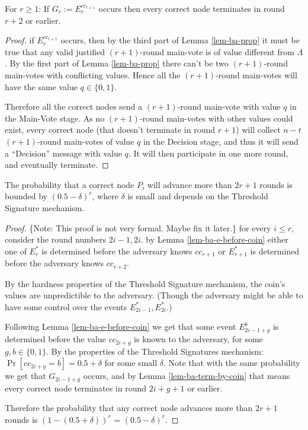 \begin{lem}
  \label{lem-ba-term-by-coin}
  For $r \geq 1$: If $G_r := E_r^{{cc}_{r+1}}$ occurs then every correct node
  terminates in round $r+2$ or earlier.
\end{lem}
\begin{proof}
  if $E_r^{{cc}_{r+1}}$ occurs, then by the third part of Lemma \ref{lem-ba-prop} it
  must be true that any valid justified $(r+1)$-round main-vote is of value
  different from $\Lambda$. By the first part of Lemma \ref{lem-ba-prop} there
  can't be two $(r+1)$-round main-votes with conflicting values. Hence all the
  $(r+1)$-round main-votes will have the same value $q \in \{0,1\}$. 
  
  Therefore all the correct nodes send a $(r+1)$-round main-vote with value $q$
  in the Main-Vote stage. As no $(r+1)$-round main-votes with other values could
  exist, every correct node (that doesn't terminate in round $r+1$) will collect
  $n-t$ $(r+1)$-round main-votes of value $q$ in the Decision stage, and thus it
  will send a ``Decision'' message with value $q$. It will then participate in
  one more round, and eventually terminate.
\end{proof}

\begin{lem}
  The probability that a correct node $P_i$ will advance more than $2r+1$ rounds
  is bounded by $(0.5 - \delta)^r$, where $\delta$ is small and depends on the
  Threshold Signature mechanism.
\end{lem}
\begin{proof}
  \{Note: This proof is not very formal. Maybe fix it later.\}
  for every $i \leq r$, consider the round numbers $2i-1,2i$. by Lemma
  \ref{lem-ba-e-before-coin} either one of $E_r^*$ is determined before the
  adversary knows ${cc}_{r+1}$ or $E_{r+1}^*$ is determined before the adversary
  knows ${cc}_{r+2}$.

  By the hardness properties of the Threshold Signature mechanism, the coin's
  values are unpredictible to the adversary. (Though the adversary might be able
  to have some control over the events $E_{2i-1}^*,E_{2i}^*$.)
  
  Following Lemma \ref{lem-ba-e-before-coin} we get that some event
  $E_{2i-1+g}^b$ is determined before the value ${cc}_{2i+g}$ is known to the
  adversary, for some $g,b \in \{0,1\}$. By the properties of the Threshold
  Signatures mechanism: $\Pr[{cc}_{2i+g} = b] = 0.5 + {\delta}$ for some
  small ${\delta}$. Note that with the same probability we get that
  $G_{2i-1+g}$ occurs, and by Lemma \ref{lem-ba-term-by-coin} that
  means every correct node terminates in round $2i+g+1$ or earlier.

  Therefore the probability that any correct node advances more than $2r + 1$
  rounds is $(1 - (0.5 + \delta))^r$ = $(0.5 - \delta)^r$.
\end{proof}


